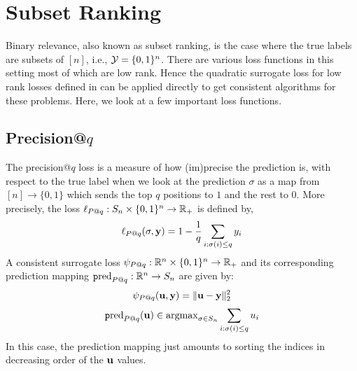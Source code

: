 \section{Subset Ranking}\label{sec:binary-relevance}
Binary relevance, also known as subset ranking, is the case where the true labels are subsets of $[n]$, i.e., ${\mathcal Y} = \{0,1\}^n$. There are various loss functions in this setting most of which are low rank. Hence the quadratic surrogate loss for low rank losses defined in \cite{ramaswamy2013convex} can be applied directly to get consistent algorithms for these problems. Here, we look at a few important loss functions.

\subsection{Precision@$q$}
The precision@$q$ loss is a measure of how (im)precise the prediction is, with respect to the true label when we look at the prediction $\sigma$ as a map from $[n] \to \{0,1\}$ which sends the top $q$ positions to $1$ and the rest to $0$. More precisely, the loss $\ell_{P@q}: S_n \times \{0,1\}^n \to {\mathbb R}_+$ is defined by,
$$\ell_{P@q}(\sigma,{\mathbf y}) = 1 - \frac{1}{q}\sum_{i:\sigma(i)\leq q}y_i$$
A consistent surrogate loss $\psi_{P@q}:{\mathbb R}^n \times \{0,1\}^n \to {\mathbb R}_+$ and its corresponding prediction mapping $\text{\texttt pred}_{P@q}:{\mathbb R}^n \to S_n$ are given by:
$$\psi_{P@q}({\mathbf u},{\mathbf y}) = \lVert {\mathbf u} - {\mathbf y} \rVert_2^2$$
$$\text{\texttt pred}_{P@q}({\mathbf u}) \in \textup{\textrm{argmax}}_{\sigma\in S_n}\sum_{i:\sigma(i)\leq q}u_i$$
In this case, the prediction mapping just amounts to sorting the indices in decreasing order of the ${\mathbf u}$ values. 

